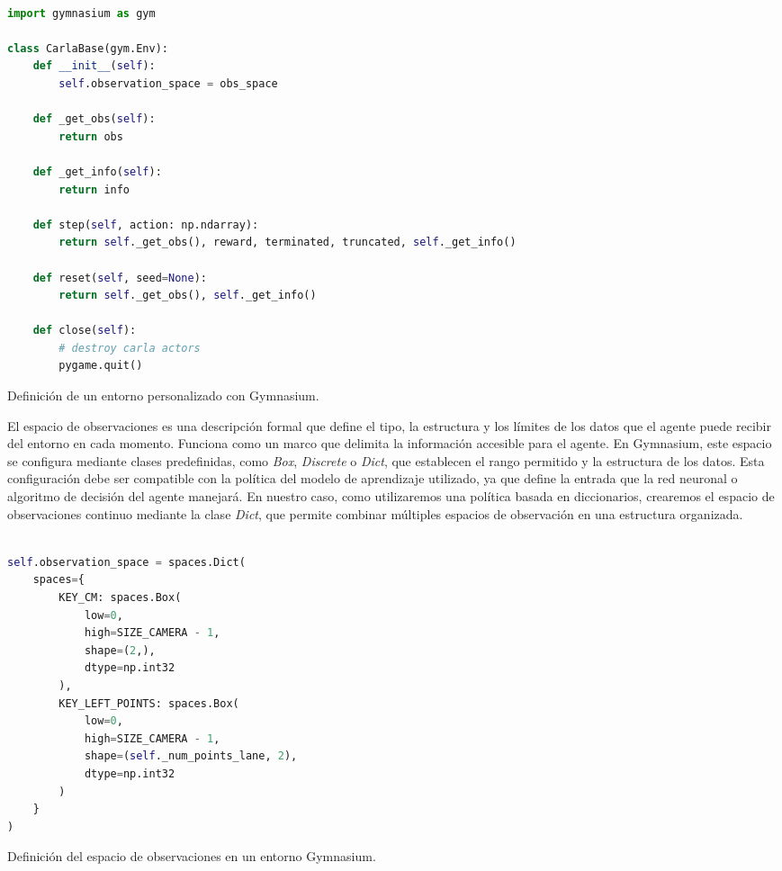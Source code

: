\begin{code}[h]
\begin{lstlisting}[language=Python]

import gymnasium as gym

class CarlaBase(gym.Env):
    def __init__(self):
        self.observation_space = obs_space
    
    def _get_obs(self):
        return obs
    
    def _get_info(self):
        return info
    
    def step(self, action: np.ndarray):
        return self._get_obs(), reward, terminated, truncated, self._get_info()
   
    def reset(self, seed=None):
        return self._get_obs(), self._get_info()
    
    def close(self):
        # destroy carla actors
        pygame.quit()

\end{lstlisting}
\caption[Definición de un entorno personalizado en Gymnasium]{Definición de un entorno personalizado con Gymnasium.}
\label{cod:gym}
\end{code}

El espacio de observaciones es una descripción formal que define el tipo, la estructura y los límites de los datos que el agente puede recibir del entorno en cada momento. Funciona como un marco que delimita la información accesible para el agente. En Gymnasium, este espacio se configura mediante clases predefinidas, como \textit{Box}, \textit{Discrete} o \textit{Dict}, que establecen el rango permitido y la estructura de los datos. Esta configuración debe ser compatible con la política del modelo de aprendizaje utilizado, ya que define la entrada que la red neuronal o algoritmo de decisión del agente manejará. En nuestro caso, como utilizaremos una política basada en diccionarios, crearemos el espacio de observaciones continuo mediante la clase \textit{Dict}, que permite combinar múltiples espacios de observación en una estructura organizada.

\begin{code}[h]
\begin{lstlisting}[language=Python]

self.observation_space = spaces.Dict(
	spaces={
		KEY_CM: spaces.Box(
			low=0,
			high=SIZE_CAMERA - 1,
			shape=(2,),
			dtype=np.int32
		),
		KEY_LEFT_POINTS: spaces.Box(
			low=0,
			high=SIZE_CAMERA - 1,
			shape=(self._num_points_lane, 2),
			dtype=np.int32
		)
	}
)

\end{lstlisting}
\caption[Definición del espacio de observaciones en un entorno Gymnasium]{Definición del espacio de observaciones en un entorno Gymnasium.}
\label{cod:gymobs}
\end{code}


